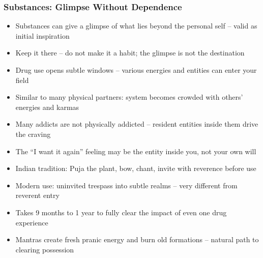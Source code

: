 \begin{frame}[fragile]\frametitle{Substances: Glimpse Without Dependence}
  \begin{itemize}
    \item Substances can give a glimpse of what lies beyond the personal self -- valid as initial inspiration
    \item Keep it there -- do not make it a habit; the glimpse is not the destination
    \item Drug use opens subtle windows -- various energies and entities can enter your field
    \item Similar to many physical partners: system becomes crowded with others' energies and karmas
    \item Many addicts are not physically addicted -- resident entities inside them drive the craving
    \item The ``I want it again'' feeling may be the entity inside you, not your own will
    \item Indian tradition: Puja the plant, bow, chant, invite with reverence before use
    \item Modern use: uninvited trespass into subtle realms -- very different from reverent entry
    \item Takes 9 months to 1 year to fully clear the impact of even one drug experience
    \item Mantras create fresh pranic energy and burn old formations -- natural path to clearing possession
  \end{itemize}
\end{frame}

